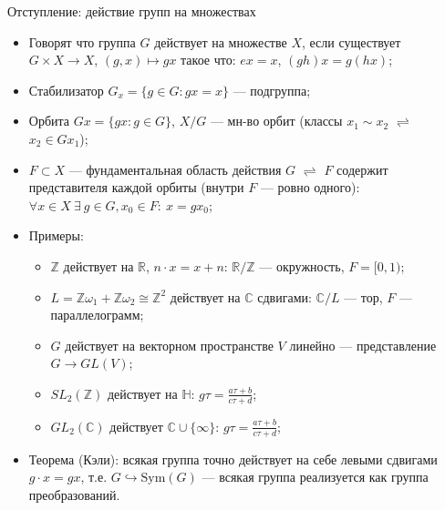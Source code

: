 \documentclass[serif, aspectratio=169]{beamer}
\begin{document}
\begin{frame}{Отступление: действие групп на множествах}
    \begin{itemize}
        \item Говорят что группа $G$ действует на множестве $X$, если существует $G\times X\to X$, $(g,x)\mapsto gx$ такое что: $ex=x$, $(gh)x=g(hx)$;
        \item Стабилизатор $G_x=\{g\in G: gx=x\}$ --- подгруппа;%
        \item Орбита $Gx=\{gx: g\in G\}$, $X/G$ --- мн-во орбит (классы $x_1\sim x_2$ $\rightleftharpoons$ $x_2\in Gx_1$);
        \item $F\subset X$ --- фундаментальная область действия $G$ $\rightleftharpoons$ $F$ содержит представителя каждой орбиты (внутри $F$ --- ровно одного): $\forall x\in X\ \exists\ g\in G, x_0\in F:\ x=gx_0$;
        \item Примеры:
        \begin{itemize}
            \item $\mathbb{Z}$ действует на $\mathbb{R}$, $n\cdot x=x+n$: $\mathbb{R}/\mathbb{Z}$ --- окружность, $F=[0,1)$;
            \item $L=\mathbb{Z}\omega_1+\mathbb{Z}\omega_2\cong\mathbb{Z}^2$ действует на $\mathbb{C}$ сдвигами: $\mathbb{C}/L$ --- тор, $F$ --- параллелограмм;
            \item $G$ действует на векторном пространстве $V$ линейно --- представление $G\to GL(V)$;
            \item $SL_2(\mathbb{Z})$ действует на $\mathbb{H}$: $g\tau=\frac{a\tau+b}{c\tau+d}$;
            \item $GL_2(\mathbb{C})$ действует $\mathbb{C}\cup\{\infty\}$: $g\tau=\frac{a\tau+b}{c\tau+d}$;
        \end{itemize}
        \item Теорема (Кэли): всякая группа точно действует на себе левыми сдвигами $g\cdot x=gx$, т.е. $G\hookrightarrow\mathrm{Sym}(G)$ --- всякая группа реализуется как группа преобразований.
    \end{itemize}
    \note{
        \begin{itemize}
            \item ---
        \end{itemize}
    }
\end{frame}
\end{document}
